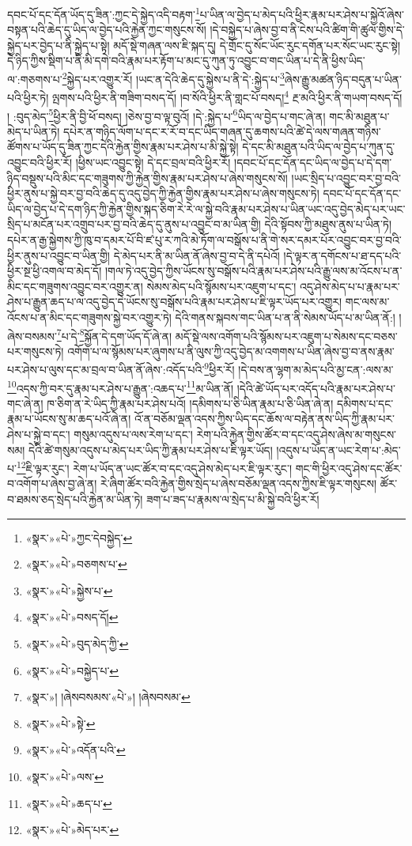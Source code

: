 དབང་པོ་དང་དོན་ཡོད་དུ་ཟིན་:ཀྱང་དེ་སྐྱེད་འདི་བརྟག་\footnote{«སྣར་»«པེ་»ཀྱང་དེབསྐྱེད་}པ་ཡིན་ལ་བྱེད་པ་མེད་པའི་ཕྱིར་རྣམ་པར་ཤེས་པ་སྐྱེའོ་ཞེས་བསྟན་པའི་ཆེད་དུ་ཡིད་ལ་བྱེད་པའི་རྐྱེན་ཀྱང་གསུངས་སོ། །དེ་བསྐྱེད་པ་ཞེས་བྱ་བ་ནི་ངེས་པའི་ཚིག་གི་ཚུལ་གྱིས་དེ་སྐྱེད་པར་བྱེད་པ་ནི་སྐྱེད་པ་སྟེ། མདོ་སྡེ་གཞན་ལས་ཇི་སྐད་དུ། དེ་གྲོང་དུ་སོང་ཡོང་རུང་དགོན་པར་སོང་ཡང་རུང་སྟེ། དེ་ཉིད་ཀྱིས་སྡིག་པ་ནི་མི་དགེ་བའི་རྣམ་པར་རྟོག་པ་མང་དུ་ཀུན་ཏུ་འབྱུང་བ་གང་ཡིན་པ་དེ་ནི་ཕྱིས་ཡིད་ལ་:གཅགས་པ་\footnote{«སྣར་»«པེ་»བཅགས་པ་}སྐྱེད་པར་འགྱུར་རོ། །ཡང་ན་དེའི་ཆེད་དུ་སྐྱེས་པ་ནི་དེ་:སྐྱེད་པ་\footnote{«སྣར་»«པེ་»སྐྱེས་པ་}ཞེས་རྒྱུ་མཚན་ཉིད་བདུན་པ་ཡིན་པའི་ཕྱིར་ཏེ། ལྤགས་པའི་ཕྱིར་ནི་གཟིག་བསད་དོ། །བ་སོའི་ཕྱིར་ནི་གླང་པོ་བསད།\footnote{«སྣར་»«པེ་»བསད་དོ།} རྔ་མའི་ཕྱིར་ནི་གཡག་བསད་དོ། །
:བུད་མེད་\footnote{«སྣར་»«པེ་»བུད་མེད་ཀྱི་}ཕྱིར་ནི་བྱི་ཕོ་བསད། །ཅེས་བྱ་བ་ལྟ་བུའོ། །དེ་:སྐྱེད་པ་\footnote{«སྣར་»«པེ་»བསྐྱེད་པ་}ཡིད་ལ་བྱེད་པ་གང་ཞེ་ན། གང་མི་མཐུན་པ་མེད་པ་ཡིན་ཏེ། དཔེར་ན་གཉིད་ལོག་པ་དང་ར་རོ་བ་དང་ཡིད་གཞན་དུ་ཆགས་པའི་ཚེ་དེ་ལས་གཞན་གཉིས་ཚོགས་པ་ཡོད་དུ་ཟིན་ཀྱང་དེའི་རྐྱེན་གྱིས་རྣམ་པར་ཤེས་པ་མི་སྐྱེ་སྟེ། དེ་དང་མི་མཐུན་པའི་ཡིད་ལ་བྱེད་པ་ཀུན་དུ་འབྱུང་བའི་ཕྱིར་རོ། །ཕྱིས་ཡང་འབྱུང་སྟེ། དེ་དང་བྲལ་བའི་ཕྱིར་རོ། །དབང་པོ་དང་དོན་དང་ཡིད་ལ་བྱེད་པ་དེ་དག་ཉིད་བསྡུས་པའི་མིང་དང་གཟུགས་ཀྱི་རྐྱེན་གྱིས་རྣམ་པར་ཤེས་པ་ཞེས་གསུངས་སོ། །ཡང་སྲིད་པ་འབྱུང་བར་བྱ་བའི་ཕྱིར་ནུས་པ་སྐྱེ་བར་བྱ་བའི་ཆེད་དུ་འདུ་བྱེད་ཀྱི་རྐྱེན་གྱིས་རྣམ་པར་ཤེས་པ་ཞེས་གསུངས་ཏེ། དབང་པོ་དང་དོན་དང་ཡིད་ལ་བྱེད་པ་དེ་དག་ཉིད་ཀྱི་རྐྱེན་གྱིས་སྐད་ཅིག་རེ་རེ་ལ་སྐྱེ་བའི་རྣམ་པར་ཤེས་པ་ཡིན་ཡང་འདུ་བྱེད་མེད་པར་ཡང་སྲིད་པ་མངོན་པར་འགྲུབ་པར་བྱ་བའི་ཆེད་དུ་ནུས་པ་འབྱུང་བ་མ་ཡིན་གྱི། དེའི་སྟོབས་ཀྱི་མཐུས་ནུས་པ་ཡིན་ཏེ། དཔེར་ན་རྒྱ་སྐྱེགས་ཀྱི་ཁུ་བ་དམར་པོ་བི་ཛ་པུ་ར་ཀའི་མེ་ཏོག་ལ་བསྒོས་པ་ནི་གེ་སར་དམར་པོར་འབྱུང་བར་བྱ་བའི་ཕྱིར་ནུས་པ་འབྱུང་བ་ཡིན་གྱི། དེ་མེད་པར་ནི་མ་ཡིན་ནོ་ཞེས་བྱ་བ་དེ་ནི་དཔེའོ། །དེ་ལྟར་ན་དགོངས་པ་ཐ་དད་པའི་ཕྱིར་སྔ་ཕྱི་འགལ་བ་མེད་དོ། །གལ་ཏེ་འདུ་བྱེད་ཀྱིས་ཡོངས་སུ་བསྒོས་པའི་རྣམ་པར་ཤེས་པའི་རྒྱུ་ལས་མ་འོངས་པ་ན་མིང་དང་གཟུགས་འབྱུང་བར་འགྱུར་ན། སེམས་མེད་པའི་སྙོམས་པར་འཇུག་པ་དང་། འདུ་ཤེས་མེད་པ་པ་རྣམ་པར་ཤེས་པ་རྒྱུན་ཆད་པ་ལ་འདུ་བྱེད་དེ་ཡོངས་སུ་བསྒོས་པའི་རྣམ་པར་ཤེས་པ་ཇི་ལྟར་ཡོད་པར་འགྱུར། གང་ལས་མ་འོངས་པ་ན་མིང་དང་གཟུགས་སྐྱེ་བར་འགྱུར་ཏེ། དེའི་གནས་སྐབས་གང་ཡིན་པ་ན་ནི་སེམས་ཡོད་པ་མ་ཡིན་ནོ:། །ཞེས་བསམས་\footnote{«སྣར་»། །ཞེསབསམས་«པེ་»། །ཞེསབསམ་}པ་དེ་\footnote{«སྣར་»«པེ་»སྟེ་}སྐྱོན་དེ་དག་ཡོད་དོ་ཞེ་ན། མདོ་སྡེ་ལས་འགོག་པའི་སྙོམས་པར་འཇུག་པ་སེམས་དང་བཅས་པར་གསུངས་ཏེ། འགོག་པ་ལ་སྙོམས་པར་ཞུགས་པ་ནི་ལུས་ཀྱི་འདུ་བྱེད་མ་འགགས་པ་ཡིན་ཞེས་བྱ་བ་ནས་རྣམ་པར་ཤེས་པ་ལུས་དང་མ་བྲལ་བ་ཡིན་ནོ་ཞེས་:འདོད་པའི་\footnote{«སྣར་»«པེ་»འདོན་པའི་}ཕྱིར་རོ། །དེ་བས་ན་ལྷག་མ་མེད་པའི་མྱ་ངན་:ལས་མ་\footnote{«སྣར་»«པེ་»ལས་}འདས་ཀྱི་བར་དུ་རྣམ་པར་ཤེས་པ་རྒྱུན་:འཆད་པ་\footnote{«སྣར་»«པེ་»ཆད་པ་}མ་ཡིན་ནོ། །དེའི་ཚེ་ཡོད་པར་འདོད་པའི་རྣམ་པར་ཤེས་པ་གང་ཞེ་ན། ཁ་ཅིག་ན་རེ་ཡིད་ཀྱི་རྣམ་པར་ཤེས་པའོ། །དམིགས་པ་ཅི་ཡིན་རྣམ་པ་ཅི་ཡིན་ཞེ་ན། དམིགས་པ་དང་རྣམ་པ་ཡོངས་སུ་མ་ཆད་པའོ་ཞེ་ན། འོ་ན་བཅོམ་ལྡན་འདས་ཀྱིས་ཡིད་དང་ཆོས་ལ་བརྟེན་ནས་ཡིད་ཀྱི་རྣམ་པར་ཤེས་པ་སྐྱེ་བ་དང་། གསུམ་འདུས་པ་ལས་རེག་པ་དང་། རེག་པའི་རྐྱེན་གྱིས་ཚོར་བ་དང་འདུ་ཤེས་ཞེས་མ་གསུངས་སམ། དེའི་ཚེ་གསུམ་འདུས་པ་མེད་པར་ཡིད་ཀྱི་རྣམ་པར་ཤེས་པ་ཇི་ལྟར་ཡོད། །འདུས་པ་ཡོད་ན་ཡང་རེག་པ་:མེད་པ་\footnote{«སྣར་»«པེ་»མེད་པར་}ཇི་ལྟར་རུང་། རེག་པ་ཡོད་ན་ཡང་ཚོར་བ་དང་འདུ་ཤེས་མེད་པར་ཇི་ལྟར་རུང་། གང་གི་ཕྱིར་འདུ་ཤེས་དང་ཚོར་བ་འགོག་པ་ཞེས་བྱ་ཞེ་ན། རེ་ཞིག་ཚོར་བའི་རྐྱེན་གྱིས་སྲེད་པ་ཞེས་བཅོམ་ལྡན་འདས་ཀྱིས་ཇི་ལྟར་གསུངས། ཚོར་བ་ཐམས་ཅད་སྲེད་པའི་རྐྱེན་མ་ཡིན་ཏེ། ཟག་པ་ཟད་པ་རྣམས་ལ་སྲེད་པ་མི་སྐྱེ་བའི་ཕྱིར་རོ། 